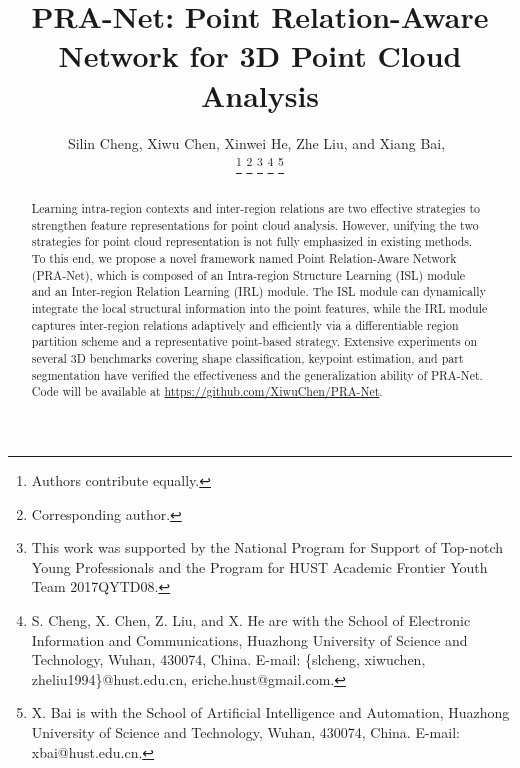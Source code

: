 \documentclass[journal]{IEEEtran}
\begin{document}
\title{PRA-Net: Point Relation-Aware Network for 3D Point Cloud Analysis}

\author{Silin Cheng,
        Xiwu Chen,
        Xinwei He,
        Zhe Liu,
        and Xiang Bai,~

\thanks{Authors contribute equally.}
\thanks{Corresponding author.}
\thanks{This work was supported by the National Program for Support of Top-notch Young Professionals and the Program for HUST Academic Frontier Youth Team 2017QYTD08.}
\thanks{S. Cheng, X. Chen, Z. Liu, and X. He are with the School of Electronic Information and Communications, Huazhong University of Science and Technology, Wuhan, 430074, China. E-mail: \{slcheng, xiwuchen, zheliu1994\}@hust.edu.cn, eriche.hust@gmail.com.}
\thanks{X. Bai is with the School of Artificial Intelligence and Automation, Huazhong University of Science and Technology, Wuhan, 430074, China. E-mail: xbai@hust.edu.cn.}


}














\maketitle

\begin{abstract}
Learning intra-region contexts and inter-region relations are two effective strategies to strengthen
feature representations for point cloud analysis. However, unifying the two strategies for point cloud representation is not fully emphasized in existing methods. To this end, we propose a novel framework named Point Relation-Aware Network (PRA-Net), which is composed of an Intra-region Structure Learning (ISL) module and an Inter-region Relation Learning (IRL) module. The ISL module can dynamically integrate the local structural information into the point features, while the IRL module captures inter-region relations adaptively and efficiently via a differentiable region partition scheme and a representative point-based strategy. Extensive experiments on several 3D benchmarks covering shape classification, keypoint estimation, and part segmentation have verified the effectiveness and the generalization ability of PRA-Net. Code will be available at \url{https://github.com/XiwuChen/PRA-Net}.
\end{abstract}
\end{document}
